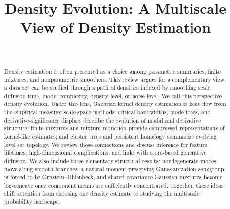 \documentclass[preprint]{imsart}
\theoremstyle{plain}
\theoremstyle{definition}
\begin{document}
\begin{frontmatter}
\title{Density Evolution: A Multiscale View of Density Estimation}

\begin{aug}
\author[A,B]{~}

\address[A]{Department of Mathematics, Baruch College}
\address[B]{Department of Mathematics, The Graduate Center, City University of New York}



\end{aug}

\begin{abstract}
Density estimation is often presented as a choice among parametric summaries, finite mixtures, and nonparametric smoothers. 
This review argues for a complementary view: a data set can be studied through a path of densities indexed by smoothing scale, diffusion time, model complexity, density level, or noise level. We call this perspective density evolution. Under this lens, Gaussian kernel density estimation is heat flow from the empirical measure; scale-space methods, critical bandwidths, mode trees, and derivative-significance displays describe the evolution of modal and derivative structure; finite mixtures and mixture reduction provide compressed representations of kernel-like estimates; and cluster trees and persistent homology summarize evolving level-set topology. We review these connections and discuss inference for feature lifetimes, high-dimensional complications, and links with score-based generative diffusion. We also include three elementary structural results: nondegenerate modes move along smooth branches, a natural moment-preserving Gaussianization semigroup is forced to be Ornstein--Uhlenbeck, and shared-covariance Gaussian mixtures become log-concave once component means are sufficiently concentrated. Together, these ideas shift attention from choosing one density estimate to studying the multiscale probability landscape.
\end{abstract}

\begin{keyword}
\end{keyword}

\end{frontmatter}
\end{document}
